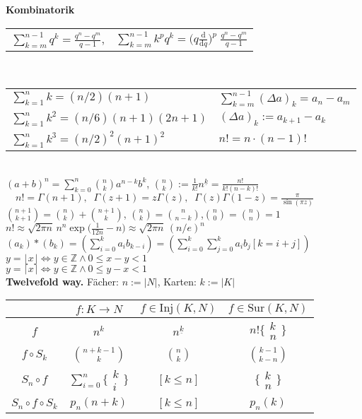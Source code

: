 \documentclass[a4paper,10pt,fleqn,twoside,twocolumn,dvipdfmx]{scrartcl}
\newcommand{\Z}{\mathbb Z}
\newcommand{\strong}[1]{\textsf{\textbf{#1}}}
\newcommand{\ds}{\displaystyle}
\newcommand{\tsbrace}[2]{%
  \big\{\!\begin{smallmatrix}#1\\ #2\end{smallmatrix}\!\big\}}
\begin{document}
\noindent
\strong{Kombinatorik}\\[2pt]
\begin{tabular}{@{}ll}
$\ds{\textstyle\sum\limits_{k=m}^{n-1}} q^k = \frac{q^n-q^m}{q-1}$,
& $\ds{\textstyle\sum\limits_{k=m}^{n-1}} k^p q^k
= \Big(q\frac{\mathrm d}{\mathrm dq}\Big)^p\;\frac{q^n-q^m}{q-1}$
\end{tabular}\\[2pt]
\begin{tabular}{@{}l|l}
$\sum_{k=1}^n k = (n/2)(n+1)$ & $\sum_{k=m}^{n-1}(\Delta a)_k = a_n-a_m$\\
$\sum_{k=1}^n k^2 = (n/6)(n+1)(2n+1)$ & $(\Delta a)_k := a_{k+1}-a_k$\\
$\sum_{k=1}^n k^3 = (n/2)^2(n+1)^2$ & $n! = n\cdot (n-1)!$
\end{tabular}\\
$\ds (a+b)^n = {\textstyle\sum\limits_{k=0}^n} \binom{n}{k}a^{n-k} b^k$,\quad
$\ds\binom{n}{k} := \frac{1}{k!}n^{\underline k} = \frac{n!}{k!(n-k)!}$\\[4pt]
$\quad n!=\Gamma(n+1),\;\; \Gamma(z+1) = z\Gamma(z),\;\;
\Gamma(z)\Gamma(1-z) = \frac{\pi}{\sin(\pi z)}$\\[2pt]
$\binom{n+1}{k+1} = \binom{n}{k}+\binom{n+1}{k}$,\quad
$\binom{n}{k} = \binom{n}{n-k}$,\quad $\binom{n}{0} = \binom{n}{n} = 1$\\[4pt]
$n! \approx\sqrt{2\pi n}\,n^n \exp\big(\frac{1}{12n}-n\big)
\approx\sqrt{2\pi n}\,(n/e)^n$\\
$(a_k)*(b_k) = (\sum_{i=0}^k a_i b_{k-i})
= (\sum_{i=0}^k\sum_{j=0}^k a_i b_j [k{=}i{+}j])$\\
$y = \lfloor x\rfloor \Leftrightarrow y\in\Z\land 0\le x-y<1$\\
$y = \lceil x\rceil \Leftrightarrow y\in\Z\land 0\le y-x<1$\\[4pt]
\strong{Twelvefold way.} Fächer: $n:=|N|$, Karten: $k:=|K|$\\
\begin{tabular}{@{}c|ccc@{}}
\toprule
& $f\colon K{\to}N$
& $f\in\mathrm{Inj}(K,N)$
& $f\in\mathrm{Sur}(K,N)$\\
\midrule
$f$
& $n^k$
& $n^{\underline k}$
& $n!\tsbrace{k}{n}$\\[2pt]
$f\circ S_k$
& $\binom{n+k-1}{k}$
& $\binom{n}{k}$
& $\binom{k-1}{k-n}$\\[2pt]
$S_n\circ f$
& $\sum_{i=0}^n\tsbrace{k}{i}$
& $[k\le n]$
& $\tsbrace{k}{n}$\\[2pt]
$S_n\circ f\circ S_k$
& $p_n(n+k)$
& $[k\le n]$
& $p_n(k)$\\
\bottomrule
\end{tabular}
\end{document}
